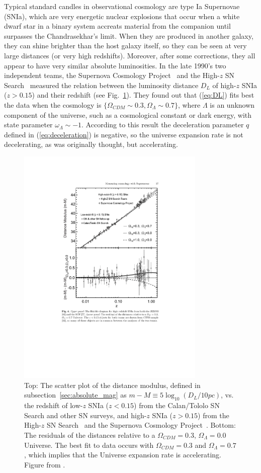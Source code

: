 Typical standard candles in observational cosmology are type Ia Supernovae (SNIa), which are very energetic nuclear explosions that occur when a white dwarf star in a binary system accreats material from the companion until surpasses the Chandrasekhar's limit. When they are produced in another galaxy, they can shine brighter than the host galaxy itself, so they can be seen at very large distances (or very high redshifts). Moreover, after some corrections, they all appear to have very similar absolute luminosities. In the late 1990’s two independent teams, the Supernova Cosmology Project~\citep{Perlmutter1999} and the High-$z$ SN Search~\citep{Riess1998} measured the relation between the luminosity distance $D_L$ of high-$z$ SNIa ($z>0.15$) and their redshift (see Fig.~\ref{fig:hubble_diagram_sn1a}). They found out that (\ref{eq:DL}) fits best the data when the cosmology is $\lbrace \Omega_{CDM} \sim 0.3, \Omega_\Lambda \sim 0.7 \rbrace$, where $\Lambda$ is an unknown component of the universe, such as a cosmological constant or dark energy, with state parameter $\omega_\Lambda \sim -1$. According to this result the deceleration parameter $q$ defined in (\ref{eq:deceleration}) is negative, so the universe expansion rate is not decelerating, as was originally thought, but accelerating.
\begin{figure}
\centering
\includegraphics[width=90mm]{./plots/perlmutter_riess_hubble_diagram.pdf}
\caption{Top: The scatter plot of the distance modulus, defined in subsection~\ref{sec:absolute_mag} as $m-M \equiv 5\log_{10}(D_L / 10pc)$, vs. the redshift of low-$z$ SNIa ($z<0.15$) from the Calan/Tololo SN Search \citep{Hamuy1993} and other SN surveys, and high-$z$ SNIa ($z>0.15$) from the High-$z$ SN Search~\citep{Riess1998} and the Supernova Cosmology Project~\citep{Perlmutter1999}. Bottom: The residuals of the distances relative to a $\Omega_{CDM}=0.3$, $\Omega_\Lambda=0.0$ Universe. The best fit to data occurs with $\Omega_{CDM}=0.3$ and $\Omega_\Lambda=0.7$, which implies that the Universe expansion rate is accelerating. Figure from \citet{Perlmutter2003}.}
\label{fig:hubble_diagram_sn1a}
\end{figure}

